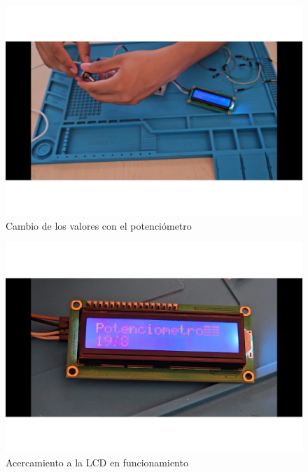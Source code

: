     
    \begin{figure}[H]
        \centering
        \includegraphics[trim ={25mm 25mm 25mm 10mm},clip,scale=0.3]{22/Img/ev5.pdf}
        \caption{Cambio de los valores con el potenciómetro}
        \label{fig:ev5}
    \end{figure}
    
    \begin{figure}[H]
        \centering
        \includegraphics[trim = {25mm 25mm 25mm 10mm},clip,scale=0.3]{22/Img/ev6.pdf}
        \caption{Acercamiento a la LCD en funcionamiento}
        \label{fig:ev6}
    \end{figure}
    
